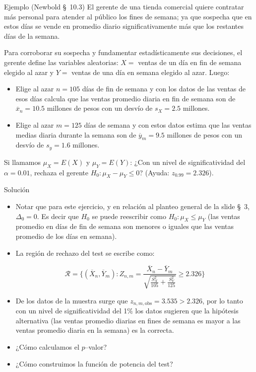 \documentclass{beamer}
\theoremstyle{definition}
\begin{document}
\begin{frame}{\color{rosee} Ejemplo (Newbold \S~10.3)}
    \small
El gerente de una tienda comercial quiere contratar más personal para atender al público los fines de semana; ya que sospecha que en estos días se vende en promedio diario significativamente más que los restantes días de la semana.\medskip

Para corroborar su sospecha y fundamentar estadísticamente sus decisiones, el gerente define las variables aleatorias: $X=$ ventas de un día en fin de semana elegido al azar y $Y=$ ventas de una día en semana elegido al azar. Luego: 
    \begin{itemize}
        \item Elige al azar $n=105$ días de fin de semana y con los datos de las ventas de esos días calcula que las ventas promedio diaria en fin de semana son de $\overline{x}_n = 10.5$ millones de pesos con un desvío de $s_X = 2.5$ millones.\medskip
        \item Elige al azar $m=125$ días de semana y con estos datos estima que las ventas medias diaria durante la semana son de $\overline{y}_m = 9.5$ millones de pesos con un desvío de $s_y = 1.6$ millones.\medskip
    \end{itemize} 
   \medskip
 
Si llamamos $\mu_X = E(X)$ y $\mu_Y = E(Y)$: ¿Con un nivel de significatividad del $\alpha=0.01$, rechaza el gerente $H_0: \mu_X - \mu_Y\leq 0$? (Ayuda: $z_{0.99}=2.326$).
   
\end{frame}


\begin{frame}{\color{rosee}Solución}
    \begin{itemize}
    \item Notar que para este ejercicio, y en relación al planteo general de la slide \S~3, $\Delta_0=0$. Es decir que $H_0$ se puede reescribir como $H_0: \mu_X \leq \mu_Y$ (las ventas promedio en días de fin de semana son menores o iguales que las ventas promedio de los días en semana).\medskip 
        \item La región de rechazo del test se escribe como:
        
        $$\mathcal{R}=\Big\{(\overline{X}_n,\overline{Y}_m): Z_{n,m}=       \frac{\overline{X}_{n}-\overline{Y}_{m}}{\sqrt{\frac{S_X^{2}}{105}
           + \frac{S_Y^2}{125}}}\geq 2.326\Big\}$$
\item De los datos de la muestra surge que $z_{n,m,\text{obs}} = 3.535>2.326$, por lo tanto con un nivel de significatividad del 1\% los datos sugieren que la hipótesis alternativa (las ventas promedio diarias en fines de semana es mayor a las ventas promedio diaria en la semana) es la correcta.\medskip
\item ¿Cómo calculamos el $p$--valor?\medskip
\item ¿Cómo construimos la función de potencia del test?
    \end{itemize}
\end{frame}
\end{document}
